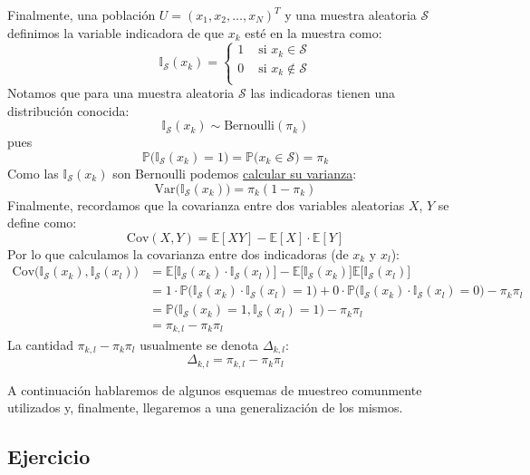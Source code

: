 \documentclass[
]{book}
\begin{document}
Finalmente, una población \(U = (x_1, x_2, \dots, x_N)^T\) y una muestra aleatoria \(\mathcal{S}\) definimos la variable indicadora de que \(x_k\) esté en la muestra como:
\[
\mathbb{I}_{\mathcal{S}}(x_k) = \begin{cases}
1 & \text{ si } x_k \in \mathcal{S} \\
0 & \text{ si } x_k \not\in \mathcal{S} \\
\end{cases}
\]
Notamos que para una muestra aleatoria \(\mathcal{S}\) las indicadoras tienen una distribución conocida:
\[
\mathbb{I}_{\mathcal{S}}(x_k) \sim \text{Bernoulli}(\pi_k)
\]
pues
\[
\mathbb{P}\big( \mathbb{I}_{\mathcal{S}}(x_k)  = 1\big) = \mathbb{P}\big(x_k \in \mathcal{S}) = \pi_k
\]
Como las \(\mathbb{I}_{\mathcal{S}}(x_k)\) son Bernoulli podemos \href{https://en.wikipedia.org/wiki/Bernoulli_distribution}{calcular su varianza}:
\[
\text{Var}\Big( \mathbb{I}_{\mathcal{S}}(x_k)\Big) = \pi_k (1 - \pi_k)
\]
Finalmente, recordamos que la covarianza entre dos variables aleatorias \(X\), \(Y\) se define como:
\[
\text{Cov}(X,Y) = \mathbb{E}[XY] - \mathbb{E}[X]\cdot\mathbb{E}[Y]
\]
Por lo que calculamos la covarianza entre dos indicadoras (de \(x_k\) y \(x_l\)):
\begin{equation}
\begin{aligned}
\text{Cov}\Big(\mathbb{I}_{\mathcal{S}}(x_k), \mathbb{I}_{\mathcal{S}}(x_l) \Big) & = \mathbb{E}\Big[\mathbb{I}_{\mathcal{S}}(x_k) \cdot \mathbb{I}_{\mathcal{S}}(x_l)\Big] -   \mathbb{E}\Big[\mathbb{I}_{\mathcal{S}}(x_k)\Big] \mathbb{E}\Big[\mathbb{I}_{\mathcal{S}}(x_l)\Big]
\\ & = 1 \cdot \mathbb{P}\Big( \mathbb{I}_{\mathcal{S}}(x_k) \cdot \mathbb{I}_{\mathcal{S}}(x_l) = 1) + 0 \cdot \mathbb{P}\Big( \mathbb{I}_{\mathcal{S}}(x_k) \cdot \mathbb{I}_{\mathcal{S}}(x_l) = 0) - \pi_k \pi_l \\
& = \mathbb{P}\Big( \mathbb{I}_{\mathcal{S}}(x_k)  = 1, \mathbb{I}_{\mathcal{S}}(x_l) = 1) - \pi_k \pi_l \\
& = \pi_{k,l} -\pi_k \pi_l
\end{aligned}
\end{equation}
La cantidad \(\pi_{k,l} -\pi_k \pi_l\) usualmente se denota \(\Delta_{k,l}\):
\[
\Delta_{k,l} = \pi_{k,l} -\pi_k \pi_l
\]

A continuación hablaremos de algunos esquemas de muestreo comunmente utilizados y, finalmente, llegaremos a una generalización de los mismos.

\hypertarget{ejercicio-5}{%
\subsection{Ejercicio}\label{ejercicio-5}}
\end{document}
